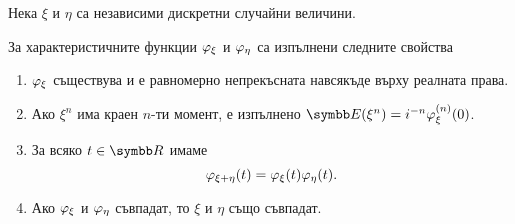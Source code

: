 \documentclass[numbers=endperiod, bibliography=totocnumbered]{scrartcl}
\begin{document}
\begin{theorem}\label{thm:char_properties}
  Нека \( \xi \) и \( \eta \) са независими дискретни случайни величини.

  За характеристичните функции \( \varphi_\xi \) и \( \varphi_\eta \) са изпълнени следните свойства
  \begin{enumerate}
    \item \( \varphi_\xi \) съществува и е равномерно непрекъсната навсякъде върху реалната права.

    \item Ако \( \xi^n \) има краен \( n \)-ти момент, е изпълнено \( \Expect(\xi^n) = i^{-n} \Char_\xi^{(n)} (0) \).

    \item За всяко \( t \in \R \) имаме
    \begin{equation*}
      \varphi_{\xi + \eta}(t) = \varphi_\xi(t) \varphi_\eta(t).
    \end{equation*}

    \item Ако \( \varphi_\xi \) и \( \varphi_\eta \) съвпадат, то \( \xi \) и \( \eta \) също съвпадат.
  \end{enumerate}
\end{theorem}
\end{document}
